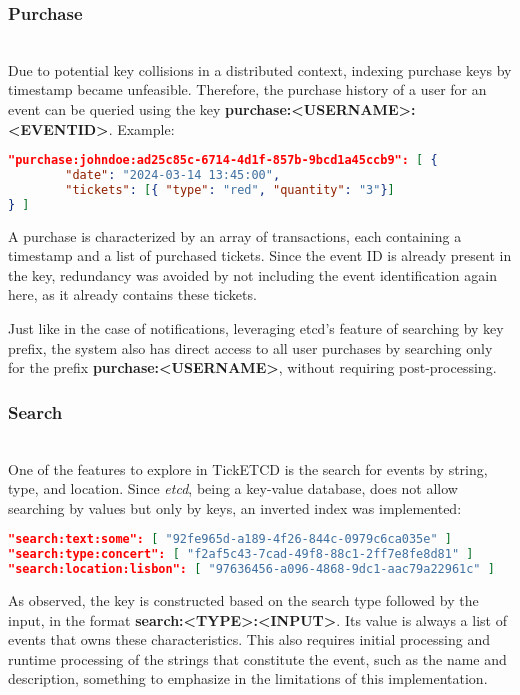 \documentclass[screen,review]{acmart}
\begin{document}
\subsubsection{Purchase}~\\
Due to potential key collisions in a distributed context, indexing purchase keys by timestamp became unfeasible. Therefore, the purchase history of a user for an event can be queried using the key \textbf{purchase:<USERNAME>:<EVENTID>}. Example:

\begin{lstlisting}[language=json]
"purchase:johndoe:ad25c85c-6714-4d1f-857b-9bcd1a45ccb9": [ {
        "date": "2024-03-14 13:45:00",
        "tickets": [{ "type": "red", "quantity": "3"}]
} ]
\end{lstlisting}

A purchase is characterized by an array of transactions, each containing a timestamp and a list of purchased tickets. Since the event ID is already present in the key, redundancy was avoided by not including the event identification again here, as it already contains these tickets.

Just like in the case of notifications, leveraging etcd's feature of searching by key prefix, the system also has direct access to all user purchases by searching only for the prefix \textbf{purchase:<USERNAME>}, without requiring post-processing.\\

\subsubsection{Search}~\\
One of the features to explore in TickETCD is the search for events by string, type, and location. Since \textit{etcd}, being a key-value database, does not allow searching by values but only by keys, an inverted index was implemented:

\begin{lstlisting}[language=json]
"search:text:some": [ "92fe965d-a189-4f26-844c-0979c6ca035e" ]
"search:type:concert": [ "f2af5c43-7cad-49f8-88c1-2ff7e8fe8d81" ]
"search:location:lisbon": [ "97636456-a096-4868-9dc1-aac79a22961c" ]
\end{lstlisting}

As observed, the key is constructed based on the search type followed by the input, in the format \textbf{search:<TYPE>:<INPUT>}. Its value is always a list of events that owns these characteristics. This also requires initial processing and runtime processing of the strings that constitute the event, such as the name and description, something to emphasize in the limitations of this implementation.
\end{document}
